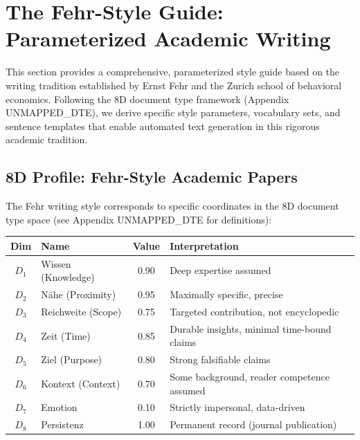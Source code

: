 
\section{The Fehr-Style Guide: Parameterized Academic Writing}
\label{sec:fehr-style-guide}

This section provides a comprehensive, parameterized style guide based on the
writing tradition established by Ernst Fehr and the Zurich school of behavioral
economics. Following the 8D document type framework (Appendix UNMAPPED_DTE), we derive
specific style parameters, vocabulary sets, and sentence templates that enable
automated text generation in this rigorous academic tradition.

\subsection{8D Profile: Fehr-Style Academic Papers}

The Fehr writing style corresponds to specific coordinates in the 8D document
type space (see Appendix UNMAPPED_DTE for definitions):

\begin{center}
\renewcommand{\arraystretch}{1.3}
\begin{tabular}{clcl}
\toprule
\textbf{Dim} & \textbf{Name} & \textbf{Value} & \textbf{Interpretation} \\
\midrule
$D_1$ & Wissen (Knowledge) & 0.90 & Deep expertise assumed \\
$D_2$ & Nähe (Proximity) & 0.95 & Maximally specific, precise \\
$D_3$ & Reichweite (Scope) & 0.75 & Targeted contribution, not encyclopedic \\
$D_4$ & Zeit (Time) & 0.85 & Durable insights, minimal time-bound claims \\
$D_5$ & Ziel (Purpose) & 0.80 & Strong falsifiable claims \\
$D_6$ & Kontext (Context) & 0.70 & Some background, reader competence assumed \\
$D_7$ & Emotion & 0.10 & Strictly impersonal, data-driven \\
$D_8$ & Persistenz & 1.00 & Permanent record (journal publication) \\
\bottomrule
\end{tabular}
\end{center}

